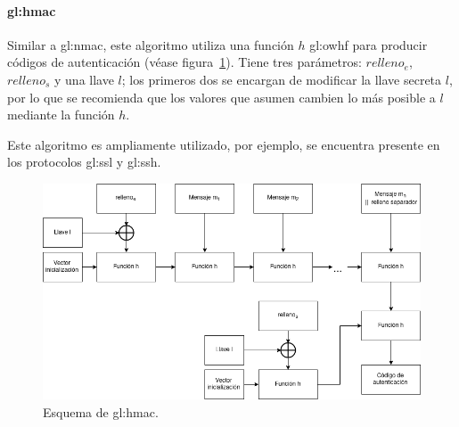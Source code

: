 
\paragraph{\texorpdfstring{\acrlong{gl:hmac}}{Keyed-Hashed MAC}}
Similar a \gls{gl:nmac}, este algoritmo utiliza una función $h$ \gls{gl:owhf}
para producir códigos de autenticación (véase figura~\ref{mac:hmac}).
Tiene tres parámetros: $relleno_e$, $relleno_s$ y una llave $l$; los primeros
dos se encargan de modificar la llave secreta $l$, por lo que se recomienda que
los valores que asumen cambien lo más posible a $l$ mediante la función $h$.

Este algoritmo es ampliamente utilizado, por ejemplo, se encuentra presente en
los protocolos \gls{gl:ssl} y \gls{gl:ssh}.

\begin{figure}
  \begin{center}
    \includegraphics[width=0.9\linewidth]{diagramas/hmac.png}
    \caption{Esquema de \acrshort{gl:hmac}.}
    \label{mac:hmac}
  \end{center}
\end{figure}
